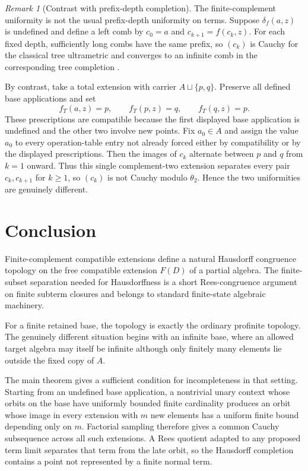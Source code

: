 \documentclass{birkau}
\theoremstyle{definition}
\theoremstyle{remark}
\newtheorem{remark}[theorem]{Remark}
\begin{document}
\begin{remark}[Contrast with prefix-depth completion]
\label{rem:prefix-depth-contrast}
The finite-complement uniformity is not the usual prefix-depth uniformity on
terms.  Suppose $\delta_f(a,z)$ is undefined and define a left comb by
$c_0=a$ and $c_{k+1}=f(c_k,z)$.  For each fixed depth, sufficiently long combs
have the same prefix, so $(c_k)$ is Cauchy for the classical tree ultrametric
and converges to an infinite comb in the corresponding tree completion
\cite{ArnoldNivat1980,Courcelle1983}.

By contrast, take a total extension with carrier $A\sqcup\{p,q\}$.  Preserve
all defined base applications and set
\[
 f_T(a,z)=p,\qquad f_T(p,z)=q,\qquad f_T(q,z)=p.
\]
These prescriptions are compatible because the first displayed base
application is undefined and the other two involve new points.  Fix
$a_0\in A$ and assign the value $a_0$ to every operation-table entry not
already forced either by compatibility or by the displayed prescriptions.
Then the images of $c_k$ alternate between $p$ and $q$ from $k=1$ onward.
Thus this single complement-two extension separates every pair
$c_k,c_{k+1}$ for $k\ge1$, so $(c_k)$ is not Cauchy modulo $\theta_2$.  Hence
the two uniformities are genuinely different.
\end{remark}

\section{Conclusion}

Finite-complement compatible extensions define a natural Hausdorff congruence
topology on the free compatible extension $F(D)$ of a partial algebra.  The
finite-subset separation needed for Hausdorffness is a short Rees-congruence
argument on finite subterm closures and belongs to standard finite-state
algebraic machinery.

For a finite retained base, the topology is exactly the ordinary profinite
topology.  The genuinely different situation begins with an infinite base,
where an allowed target algebra may itself be infinite although only finitely
many elements lie outside the fixed copy of $A$.

The main theorem gives a sufficient condition for incompleteness in that
setting.  Starting from an undefined base application, a nontrivial unary
context whose orbits on the base have uniformly bounded finite cardinality
produces an orbit whose image in every extension with $m$ new elements has a
uniform finite bound depending only on $m$.  Factorial sampling therefore gives
a common Cauchy subsequence across all such extensions.  A Rees quotient
adapted to any proposed term limit separates that term from the late orbit, so
the Hausdorff completion contains a point not represented by a finite normal
term.
\end{document}
